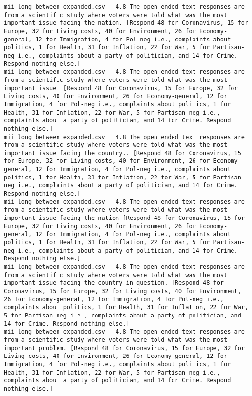 \begin{lstlisting}[label=lst:promptvariants]
mii_long_between_expanded.csv	4.8	The open ended text responses are from a scientific study where voters were told what was the most important issue facing the nation. [Respond 48 for Coronavirus, 15 for Europe, 32 for Living costs, 40 for Environment, 26 for Economy-general, 12 for Immigration, 4 for Pol-neg i.e., complaints about politics, 1 for Health, 31 for Inflation, 22 for War, 5 for Partisan-neg i.e., complaints about a party of politician, and 14 for Crime. Respond nothing else.]
mii_long_between_expanded.csv	4.8	The open ended text responses are from a scientific study where voters were told what was the most important issue. [Respond 48 for Coronavirus, 15 for Europe, 32 for Living costs, 40 for Environment, 26 for Economy-general, 12 for Immigration, 4 for Pol-neg i.e., complaints about politics, 1 for Health, 31 for Inflation, 22 for War, 5 for Partisan-neg i.e., complaints about a party of politician, and 14 for Crime. Respond nothing else.]
mii_long_between_expanded.csv	4.8	The open ended text responses are from a scientific study where voters were told what was the most important issue facing the country.. [Respond 48 for Coronavirus, 15 for Europe, 32 for Living costs, 40 for Environment, 26 for Economy-general, 12 for Immigration, 4 for Pol-neg i.e., complaints about politics, 1 for Health, 31 for Inflation, 22 for War, 5 for Partisan-neg i.e., complaints about a party of politician, and 14 for Crime. Respond nothing else.]
mii_long_between_expanded.csv	4.8	The open ended text responses are from a scientific study where voters were told what was the most important issue facing the nation [Respond 48 for Coronavirus, 15 for Europe, 32 for Living costs, 40 for Environment, 26 for Economy-general, 12 for Immigration, 4 for Pol-neg i.e., complaints about politics, 1 for Health, 31 for Inflation, 22 for War, 5 for Partisan-neg i.e., complaints about a party of politician, and 14 for Crime. Respond nothing else.]
mii_long_between_expanded.csv	4.8	The open ended text responses are from a scientific study where voters were told what was the most important issue facing the country in question. [Respond 48 for Coronavirus, 15 for Europe, 32 for Living costs, 40 for Environment, 26 for Economy-general, 12 for Immigration, 4 for Pol-neg i.e., complaints about politics, 1 for Health, 31 for Inflation, 22 for War, 5 for Partisan-neg i.e., complaints about a party of politician, and 14 for Crime. Respond nothing else.]
mii_long_between_expanded.csv	4.8	The open ended text responses are from a scientific study where voters were told what was the most important problem. [Respond 48 for Coronavirus, 15 for Europe, 32 for Living costs, 40 for Environment, 26 for Economy-general, 12 for Immigration, 4 for Pol-neg i.e., complaints about politics, 1 for Health, 31 for Inflation, 22 for War, 5 for Partisan-neg i.e., complaints about a party of politician, and 14 for Crime. Respond nothing else.]

\end{lstlisting}
